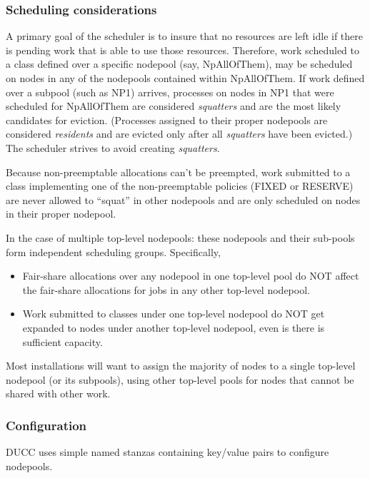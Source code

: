 \subsubsection{Scheduling considerations}
    A primary goal of the scheduler is to insure that no resources are left idle if there
    is pending work that is able to use those resources.  Therefore, work scheduled to
    a class defined over a specific nodepool (say, NpAllOfThem), may be scheduled on nodes
    in any of the nodepools contained within NpAllOfThem.  If work defined over a
    subpool (such as NP1) arrives, processes on nodes in NP1 that were scheduled for
    NpAllOfThem are considered {\em squatters} and are the most likely candidates for
    eviction. (Processes assigned to their proper nodepools are considered {\em residents}
    and are evicted only after all {\em squatters} have been evicted.)  The scheduler strives
    to avoid creating {\em squatters}.

    Because non-preemptable allocations can't be preempted, work submitted to a class
    implementing one of the non-preemptable policies (FIXED or RESERVE) are never allowed
    to ``squat'' in other nodepools and are only scheduled on nodes in their
    proper nodepool.

    In the case of multiple top-level nodepools: these nodepools and their sub-pools
    form independent scheduling groups.  Specifically,
    \begin{itemize}
        \item Fair-share allocations over any nodepool in one top-level pool do NOT affect the
          fair-share allocations for jobs in any other top-level nodepool. 

        \item Work submitted to classes under one top-level nodepool do NOT get expanded to
          nodes under another top-level nodepool, even is there is sufficient capacity.
    \end{itemize}

    Most installations will want to assign the majority of nodes to a single top-level
    nodepool (or its subpools), using other top-level pools for nodes that cannot be
    shared with other work.

\subsubsection{Configuration}
\label{subsubsec:nodepool.configuration}
    DUCC uses simple named stanzas containing key/value pairs to configure nodepools.

